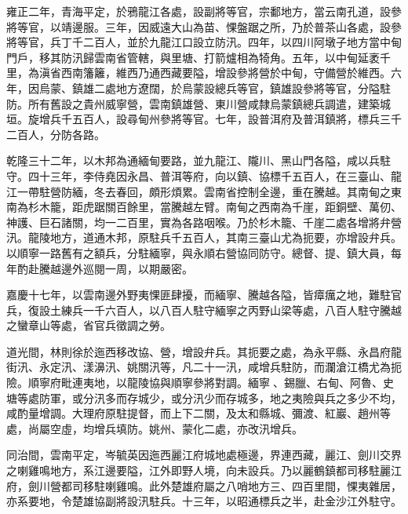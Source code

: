 \begin{pinyinscope}
雍正二年，青海平定，於鴉龍江各處，設副將等官，宗鄱地方，當云南孔道，設參將等官，以靖邊服。三年，因威遠大山為苗、惈盤踞之所，乃於普茶山各處，設參將等官，兵丁千二百人，並於九龍江口設立防汛。四年，以四川阿墩子地方當中甸門戶，移其防汛歸雲南省管轄，與里塘、打箭爐相為犄角。五年，以中甸延袤千里，為滇省西南籓籬，維西乃通西藏要隘，增設參將營於中甸，守備營於維西。六年，因烏蒙、鎮雄二處地方遼闊，於烏蒙設總兵等官，鎮雄設參將等官，分隘駐防。所有舊設之貴州威寧營，雲南鎮雄營、東川營咸隸烏蒙鎮總兵調遣，建築城垣。旋增兵千五百人，設尋甸州參將等官。七年，設普洱府及普洱鎮將，標兵三千二百人，分防各路。

乾隆三十二年，以木邦為通緬甸要路，並九龍江、隴川、黑山門各隘，咸以兵駐守。四十三年，李侍堯因永昌、普洱等府，向以鎮、協標千五百人，在三臺山、龍江一帶駐營防緬，冬去春回，頗形煩累。雲南省控制全邊，重在騰越。其南甸之東南為杉木籠，距虎踞關百餘里，當騰越左臂。南甸之西南為千崖，距銅壁、萬仞、神護、巨石諸關，均一二百里，實為各路咽喉。乃於杉木籠、千崖二處各增將弁營汛。龍陵地方，道通木邦，原駐兵千五百人，其南三臺山尤為扼要，亦增設弁兵。以順寧一路舊有之額兵，分駐緬寧，與永順右營協同防守。總督、提、鎮大員，每年酌赴騰越邊外巡閱一周，以期嚴密。

嘉慶十七年，以雲南邊外野夷惈匪肆擾，而緬寧、騰越各隘，皆瘴癘之地，難駐官兵，復設土練兵一千六百人，以八百人駐守緬寧之丙野山梁等處，八百人駐守騰越之蠻章山等處，省官兵徵調之勞。

道光間，林則徐於迤西移改協、營，增設弁兵。其扼要之處，為永平縣、永昌府龍街汛、永定汛、漾濞汛、姚關汛等，凡二十一汛，咸增兵駐防，而瀾滄江橋尤為扼險。順寧府毗連夷地，以龍陵協與順寧參將對調。緬寧、錫臘、右甸、阿魯、史塘等處防軍，或分汛多而存城少，或分汛少而存城多，地之夷險與兵之多少不均，咸酌量增調。大理府原駐提督，而上下二關，及太和縣城、彌渡、紅巖、趙州等處，尚屬空虛，均增兵填防。姚州、蒙化二處，亦改汛增兵。

同治間，雲南平定，岑毓英因迤西麗江府城地處極邊，界連西藏，麗江、劍川交界之喇雞鳴地方，系江邊要隘，江外即野人境，向未設兵。乃以麗鶴鎮都司移駐麗江府，劍川營都司移駐喇雞鳴。此外楚雄府屬之八哨地方三、四百里間，惈夷雜居，亦系要地，令楚雄協副將設汛駐兵。十三年，以昭通標兵之半，赴金沙江外駐守。


\end{pinyinscope}
